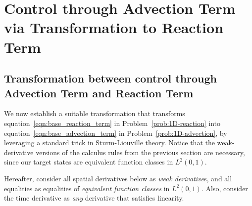 \documentclass{ifacconf}
\def\RG{}
\begin{document}
\section{Control through Advection Term via Transformation to Reaction Term}
\subsection{Transformation between control through Advection Term and Reaction Term}

\RG{We now establish a suitable transformation that transforms equation~\eqref{eqn:base_reaction_term} in Problem~\ref{prob:1D-reaction} into equation~\eqref{eqn:base_advection_term} in Problem~\ref{prob:1D-advection}, by leveraging a standard trick in Sturm-Liouville theory.} 
Notice that the weak-derivative versions of the calculus rules from the previous section are necessary, since our target states are equivalent function classes in $L^2(0,1)$.

Hereafter, consider all spatial derivatives below as \textit{weak derivative}s, and all equalities as equalities of \textit{equivalent function classes} in $L^2(0,1)$. Also, consider the time derivative as \textit{any} derivative that satisfies linearity.
\end{document}
